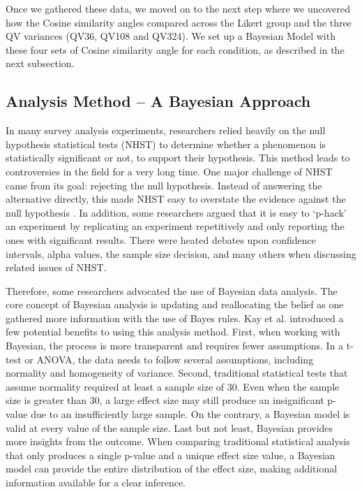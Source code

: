 Once we gathered these data, we moved on to the next step where we uncovered how the Cosine similarity angles compared across the Likert group and the three QV variances (QV36, QV108 and QV324). We set up a Bayesian Model with these four sets of Cosine similarity angle for each condition, as described in the next subsection.

\subsection{Analysis Method -- A Bayesian Approach}
\label{exp1:The Bayesian Model}


In many survey analysis experiments, researchers relied heavily on the null hypothesis statistical tests (NHST) to determine whether a phenomenon is statistically significant or not, to support their hypothesis. This method leads to controversies in the field for a very long time. One major challenge of NHST came from its goal: rejecting the null hypothesis. Instead of answering the alternative directly, this made NHST easy to overstate the evidence against the null hypothesis \cite{david2000NHST}. In addition, some researchers \cite{kruschke2010bayesian} argued that it is easy to `p-hack' an experiment by replicating an experiment repetitively and only reporting the ones with significant results. There were heated debates upon confidence intervals, alpha values, the sample size decision, and many others when discussing related issues of NHST.

Therefore, some researchers advocated the use of Bayesian data analysis. The core concept of Bayesian analysis is updating and reallocating the belief as one gathered more information with the use of Bayes rules. Kay et al. \cite{kay2016researcher} introduced a few potential benefits to using this analysis method. First, when working with Bayesian, the process is more transparent and requires fewer assumptions. In a t-test or ANOVA, the data needs to follow several assumptions, including normality and homogeneity of variance. Second, traditional statistical tests that assume normality required at least a sample size of 30. Even when the sample size is greater than 30, a large effect size may still produce an insignificant p-value due to an insufficiently large sample. On the contrary, a Bayesian model is valid at every value of the sample size. Last but not least, Bayesian provides more insights from the outcome. When comparing traditional statistical analysis that only produces a single p-value and a unique effect size value, a Bayesian model can provide the entire distribution of the effect size, making additional information available for a clear inference.


